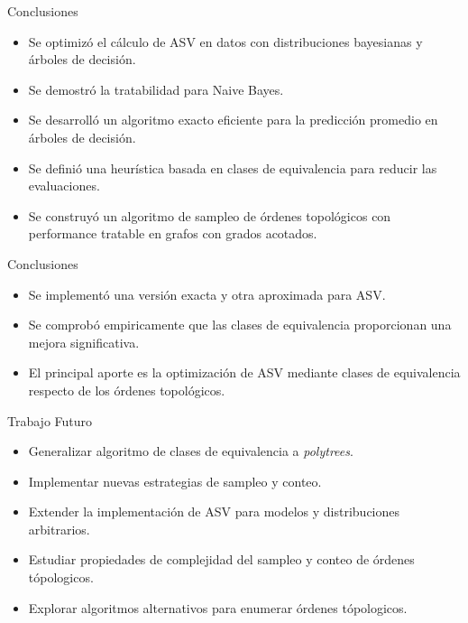 \begin{frame}{Conclusiones}
	\begin{itemize}[<+- | alert@+>]
		\item Se optimiz\'o el c\'alculo de ASV en datos con distribuciones bayesianas y árboles de decisión.
		\item Se demostr\'o la tratabilidad para Naive Bayes.
		\item Se desarroll\'o un algoritmo exacto eficiente para la predicci\'on promedio en árboles de decisión.
		\item Se defini\'o una heur\'istica basada en clases de equivalencia para reducir las evaluaciones.
		\item Se construy\'o un algoritmo de sampleo de órdenes topológicos con performance tratable en grafos con grados acotados.
	\end{itemize}
\end{frame}

\begin{frame}{Conclusiones}
	\begin{itemize}[<+- | alert@+>]
		\item Se implement\'o una versi\'on exacta y otra aproximada para ASV.
		\item Se comprobó empiricamente que las clases de equivalencia proporcionan una mejora significativa. 
		\item El principal aporte es la optimizaci\'on de ASV mediante clases de equivalencia respecto de los órdenes topológicos.
	\end{itemize}
\end{frame}

\begin{frame}{Trabajo Futuro}
	\begin{itemize}[<+- | alert@+>]
		\item Generalizar algoritmo de clases de equivalencia a \emph{polytrees}.
		\item Implementar nuevas estrategias de sampleo y conteo. %
		\item Extender la implementación de ASV para modelos y distribuciones arbitrarios.
		\item Estudiar propiedades de complejidad del sampleo y conteo de órdenes tópologicos.
		\item Explorar algoritmos alternativos para enumerar órdenes tópologicos.
		
	\end{itemize}
\end{frame}

